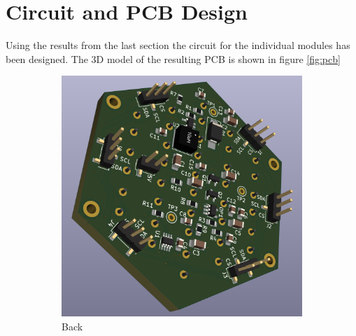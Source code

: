 \chapter{Circuit and PCB Design}
%
Using the results from the last section the circuit for the individual modules has been designed. The 3D model of the resulting PCB is shown in figure \ref{fig:pcb}
%




%
\begin{figure}[ht]
  \centering
  \begin{subfigure}[b]{0.6\textwidth}
    \includegraphics[width=\textwidth]{src/assets/pictures/circuit/pcb_back.png}
    \caption{Back}
    \label{fig:pcb:back}
  \end{subfigure}
  \\
  \begin{subfigure}[b]{0.6\textwidth}

\end{subfigure}
\end{figure}
